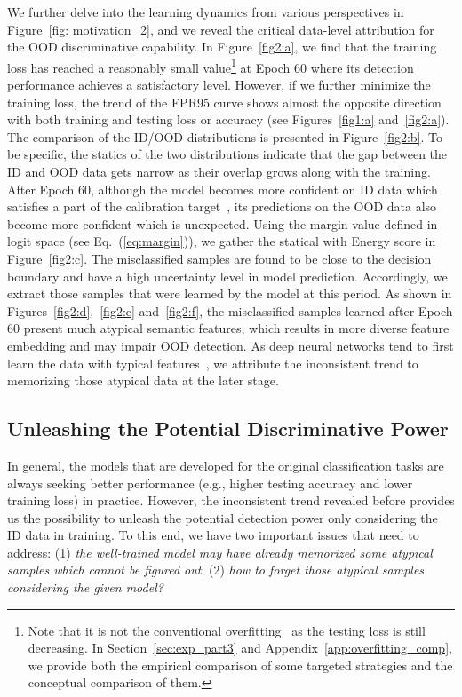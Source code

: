 \documentclass{article}
\theoremstyle{plain}
\theoremstyle{definition}
\theoremstyle{remark}
\begin{document}
We further delve into the learning dynamics from various perspectives in Figure~\ref{fig: motivation_2}, and we reveal the critical data-level attribution for the OOD discriminative capability. In Figure~\ref{fig2:a}, we find that the training loss has reached a reasonably small value\footnote{Note that it is not the conventional overfitting~\citep{goodfellow2016deep} as the testing loss is still decreasing. In Section~\ref{sec:exp_part3} and Appendix~\ref{app:overfitting_comp}, we provide both the empirical comparison of some targeted strategies and the conceptual comparison of them.} at Epoch 60 where its detection performance achieves a satisfactory level. However, if we further minimize the training loss, the trend of the FPR95 curve shows almost the opposite direction with both training and testing loss or accuracy (see Figures~\ref{fig1:a} and~\ref{fig2:a}). The comparison of the ID/OOD distributions is presented in Figure~\ref{fig2:b}. To be specific, the statics of the two distributions indicate that the gap between the ID and OOD data gets narrow as their overlap grows along with the training. After Epoch 60, although the model becomes more confident on ID data which satisfies a part of the calibration target~\citep{hendrycks2019using}, its predictions on the OOD data also become more confident which is unexpected. Using the margin value defined in logit space (see Eq.~(\ref{eq:margin})), we gather the statical with Energy score in Figure~\ref{fig2:c}. The misclassified samples are found to be close to the decision boundary and have a high uncertainty level in model prediction. Accordingly, we extract those samples that were learned by the model at this period. As shown in Figures~\ref{fig2:d},~\ref{fig2:e} and~\ref{fig2:f}, the misclassified samples learned after Epoch 60 present much atypical semantic features, which results in more diverse feature embedding and may impair OOD detection. As deep neural networks tend to first learn the data with typical features~\citep{arpit2017closer}, we attribute the inconsistent trend to memorizing those atypical data at the later stage. 



\subsection{Unleashing the Potential Discriminative Power}
\label{sec:method_part2}

In general, the models that are developed for the original classification tasks are always seeking better performance (e.g., higher testing accuracy and lower training loss) in practice. However, the inconsistent trend revealed before provides us the possibility to unleash the potential detection power only considering the ID data in training. To this end, we have two important issues that need to address: (1) \textit{the well-trained model may have already memorized some atypical samples which cannot be figured out}; (2) \textit{how to forget those atypical samples considering the given model?} 
\end{document}
